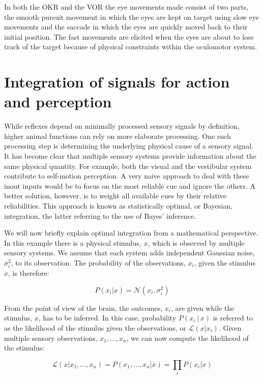 In both the OKR and the VOR the eye movements made consist of two parts, the smooth pursuit movement in which the eyes are kept on target using slow eye movements and the saccade in which the eyes are quickly moved back to their initial position. The fast movements are elicited when the eyes are about to lose track of the target because of physical constraints within the oculomotor system.



\section{Integration of signals for action and perception}

While reflexes depend on minimally processed sensory signals by definition, higher animal functions can rely on more elaborate processing. One such processing step is determining the underlying physical cause of a sensory signal. It has become clear that multiple sensory systems provide information about the same physical quantity. For example, both the visual and the vestibular system contribute to self-motion perception. A very naive approach to deal with these inout inputs would be to focus on the most reliable cue and ignore the others. A better solution, however, is to weight all available cues by their  relative reliabilities. This approach is known as statistically optimal, or Bayesian, integration, the latter referring to the use  of Bayes' inference. 

We will now briefly explain optimal integration from a mathematical perspective.  In this example there is a physical stimulus, $x$, which is observed by multiple sensory systems. We assume that each system adds independent Gaussian noise, $\sigma_i^2$, to its observation. The probability of the observations, $x_i$, given the stimulus $x$, is therefore:

\begin{equation}
P(x_i|x)= \mathcal{N}(x_i, \sigma_i^2)
\end{equation}

From the point of view of the brain, the outcomes, $x_i$, are given while the stimulus, $x$, has to be inferred. In this case, probability $P(x_i│x)$ is referred to as the likelihood of  the  stimulus given the observations, or $\mathcal{L}(x|x_i)$. Given multiple sensory observations, $x_1,...,x_n$, we can now compute the likelihood of the stimulus:

\begin{equation}
\mathcal{L}(x|x_1,...,x_n) = P(x_1,...,x_n|x) = \prod_i P(x_i|x)
\end{equation}

